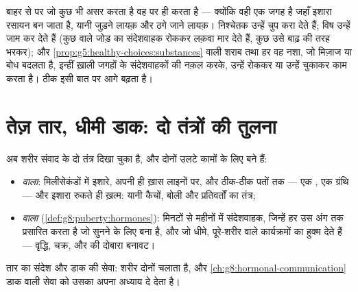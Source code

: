 \begin{remark}\label{rem:g8:nervous-communication:vulnerable}
बाहर से  पर जो कुछ भी असर करता है वह  पर
ही करता है --- क्योंकि वही एक जगह है जहाँ इशारा रसायन बन जाता है, यानी
जुड़ने लायक़ और ठगे जाने लायक़। निश्चेतक उन्हें चुप करा देते हैं; विष
उन्हें जाम कर देते हैं (कुछ  वाले जोड़ का संदेशवाहक रोककर लक़वा मार
देते हैं, कुछ उसे बाढ़ की तरह भरकर); और
\cref{prop:g5:healthy-choices:substances} वाली शराब तथा हर वह नशा, जो
मिज़ाज या बोध बदलता है, इन्हीं ख़ाली जगहों के संदेशवाहकों की नक़ल करके,
उन्हें रोककर या उन्हें चुकाकर काम करता है।
 ठीक इसी बात पर आगे बढ़ता
है।
\end{remark}

\section{तेज़ तार, धीमी डाक: दो तंत्रों की तुलना}

\begin{proposition}[तंत्रिकाएँ बनाम हॉर्मोन]\label{prop:g8:nervous-communication:compare}
अब शरीर संवाद के दो तंत्र दिखा चुका है, और दोनों उलटे कामों के लिए बने
हैं:
\begin{itemize}
  \item \emph{ वाला}: मिलीसेकंडों में इशारे, अपनी ही ख़ास
        लाइनों पर, और ठीक-ठीक पतों तक --- एक , एक ग्रंथि --- और
        इशारा रुकते ही ख़त्म: यानी कैचों, बोली और प्रतिवर्तों का
        तंत्र;
  \item \emph{ वाला} (\cref{def:g8:puberty:hormones}):
        मिनटों से महीनों में संदेशवाहक, जिन्हें  हर उस अंग तक
        प्रसारित करता है जो सुनने के लिए बना है, और जो धीमे,
        पूरे-शरीर वाले कार्यक्रमों का हुक्म देते हैं --- वृद्धि, चक्र,
        और  की दोबारा बनावट।
\end{itemize}
तार का संदेश और डाक की सेवा: शरीर दोनों चलाता है, और
\cref{ch:g8:hormonal-communication} डाक वाली सेवा को उसका अपना अध्याय दे
देता है।
\end{proposition}
\admitted

